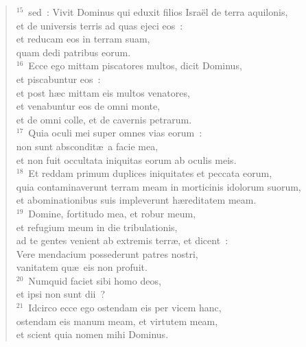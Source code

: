 \begin{flushleft}
\begin{verse}
${}^{15}$~sed~: Vivit Dominus qui eduxit filios Isra\"el de terra aquilonis,\\ et de universis terris ad quas ejeci eos~:\\ et reducam eos in terram suam,\\ quam dedi patribus eorum.\\
${}^{16}$~Ecce ego mittam piscatores multos, dicit Dominus,\\ et piscabuntur eos~:\\ et post h\ae c mittam eis multos venatores,\\ et venabuntur eos de omni monte,\\ et de omni colle, et de cavernis petrarum.\\
${}^{17}$~Quia oculi mei super omnes vias eorum~:\\ non sunt abscondit\ae\ a facie mea,\\ et non fuit occultata iniquitas eorum ab oculis meis.\\
${}^{18}$~Et reddam primum duplices iniquitates et peccata eorum,\\ quia contaminaverunt terram meam in morticinis idolorum suorum,\\ et abominationibus suis impleverunt h\ae reditatem meam.\\
${}^{19}$~Domine, fortitudo mea, et robur meum,\\ et refugium meum in die tribulationis,\\ ad te gentes venient ab extremis terr\ae , et dicent~:\\ Vere mendacium possederunt patres nostri,\\ vanitatem qu\ae\ eis non profuit.\\
${}^{20}$~Numquid faciet sibi homo deos,\\ et ipsi non sunt dii~?\\
${}^{21}$~Idcirco ecce ego ostendam eis per vicem hanc,\\ ostendam eis manum meam, et virtutem meam,\\ et scient quia nomen mihi Dominus.\end{verse}\end{flushleft}



